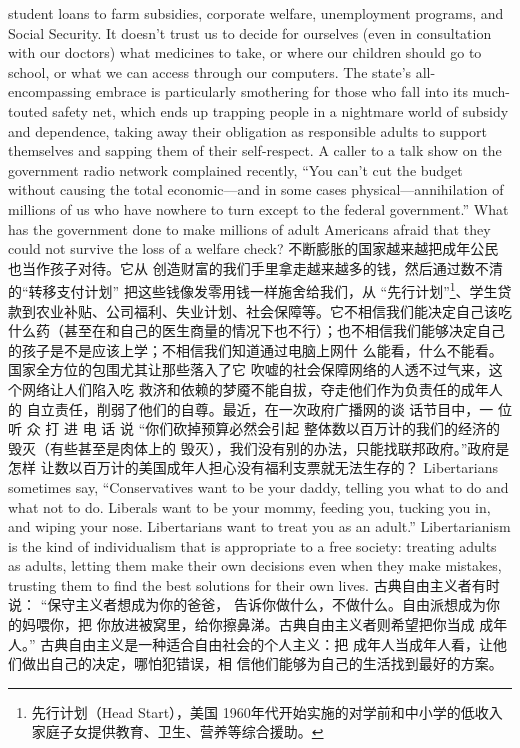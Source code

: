 \begin{paracol}{2}
student loans to farm subsidies, corporate welfare, unemployment programs, and Social Security. It doesn't trust us to decide
for ourselves (even in consultation with our doctors) what medicines to take, or where our children should go to school, or
what we can access through our computers. The state's all-encompassing embrace is particularly smothering for those who
fall into its much-touted safety net, which ends up trapping
people in a nightmare world of subsidy and dependence, taking
away their obligation as responsible adults to support themselves and sapping them of their self-respect. A caller to a talk
show on the government radio network complained recently,
``You can't cut the budget without causing the total economic---and in some cases physical---annihilation of millions of us who have nowhere to turn except to the federal government.'' What has the government done to make millions of
adult Americans afraid that they could not survive the loss of a
welfare check?
\switchcolumn
不断膨胀的国家越来越把成年公民也当作孩子对待。它从
创造财富的我们手里拿走越来越多的钱，然后通过数不清的“转移支付计划” 把这些钱像发零用钱一样施舍给我们，从
“先行计划”\footnote{先行计划（Head  Start），美国 1960年代开始实施的对学前和中小学的低收入家庭子女提供教育、卫生、营养等综合援助。}、学生贷款到农业补贴、公司福利、失业计划、社会保障等。它不相信我们能决定自己该吃什么药（甚至在和自己的医生商量的情况下也不行）；也不相信我们能够决定自己的孩子是不是应该上学；不相信我们知道通过电脑上网什
么能看，什么不能看。国家全方位的包围尤其让那些落入了它
吹嘘的社会保障网络的人透不过气来，这个网络让人们陷入吃
救济和依赖的梦魇不能自拔，夺走他们作为负责任的成年人的
自立责任，削弱了他们的自尊。最近，在一次政府广播网的谈
话节目中，一 位 听 众 打 进 电 话 说 “你们砍掉预算必然会引起
整体数以百万计的我们的经济的毁灭（有些甚至是肉体上的
毁灭），我们没有别的办法，只能找联邦政府。”政府是怎样
让数以百万计的美国成年人担心没有福利支票就无法生存的？
\switchcolumn*
Libertarians sometimes say, ``Conservatives want to be your
daddy, telling you what to do and what not to do. Liberals want
to be your mommy, feeding you, tucking you in, and wiping
your nose. Libertarians want to treat you as an adult.'' Libertarianism is the kind of individualism that is appropriate to a free
society: treating adults as adults, letting them make their own
decisions even when they make mistakes, trusting them to find
the best solutions for their own lives.
\switchcolumn
古典自由主义者有时说： “保守主义者想成为你的爸爸，
告诉你做什么，不做什么。自由派想成为你的妈喂你，把
你放进被窝里，给你擦鼻涕。古典自由主义者则希望把你当成
成年人。” 古典自由主义是一种适合自由社会的个人主义：把
成年人当成年人看，让他们做出自己的决定，哪怕犯错误，相
信他们能够为自己的生活找到最好的方案。
\end{paracol}
